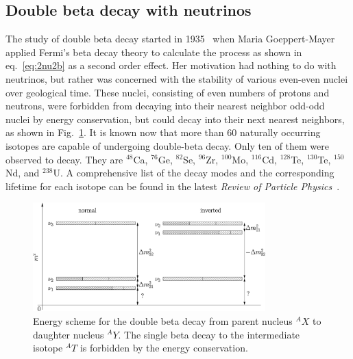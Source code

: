 \subsection{Double beta decay with neutrinos}
\label{sec:2n2b}
The study of double beta decay started in 1935~\cite{Goe35} when Maria Goeppert-Mayer applied Fermi's beta decay theory to calculate the process as shown in eq.~\ref{eq:2nu2b} as a second order effect. Her motivation had nothing to do with neutrinos, but rather was concerned with the stability of various even-even nuclei over geological time. These nuclei, consisting of even numbers of protons and neutrons, were forbidden from decaying into their nearest neighbor odd-odd nuclei by energy conservation, but could decay into their next nearest neighbors, as shown in Fig.~\ref{fig:ee2oo}. It is known now that more than 60 naturally occurring isotopes are capable of undergoing double-beta decay. Only ten of them were observed to decay. They are $^{48}$Ca, $^{76}$Ge, $^{82}$Se, $^{96}$Zr, $^{100}$Mo, $^{116}$Cd, $^{128}$Te, $^{130}$Te, $^{150}$Nd, and $^{238}$U. A comprehensive list of the decay modes and the corresponding lifetime for each isotope can be found in the latest \emph{Review of Particle Physics}~\cite{PDG07}.
\begin{figure}[tbhp]
  \centering
  \includegraphics[width=0.8\textwidth]{massHierarchy.eps}  
  \caption{Energy scheme for the double beta decay from parent nucleus
$^{A}X$ to daughter nucleus $^{A}Y$. The single beta decay to the
intermediate isotope $^{A}T$ is forbidden by the energy conservation.}
  \label{fig:ee2oo}
\end{figure}

